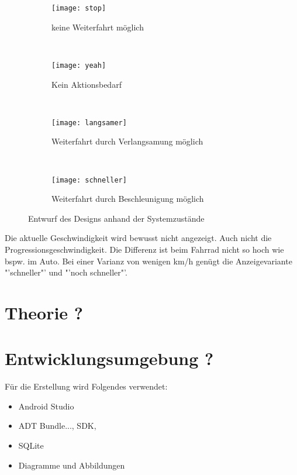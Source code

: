 \begin{figure}[h]
        \centering
           \begin{subfigure}[t]{0.23\textwidth}
                \texttt{[image: stop]}
                \caption[Systemzustand a]{keine Weiterfahrt möglich}
                \label{fig:stop}
        \end{subfigure}
           ~ 
              \begin{subfigure}[t]{0.23\textwidth}
                \texttt{[image: yeah]}
                \caption[Systemzustand b]{Kein Aktionsbedarf}
                \label{fig:yeah}
        \end{subfigure}
           ~
        \begin{subfigure}[t]{0.23\textwidth}
                \texttt{[image: langsamer]}
                \caption[Systemzustand c]{Weiterfahrt durch Verlangsamung  möglich}
                \label{fig:langsamer}
        \end{subfigure}
        ~
        \begin{subfigure}[t]{0.23\textwidth}
                \texttt{[image: schneller]}
                \caption[Systemzustand d]{Weiterfahrt durch Beschleunigung möglich}
                \label{fig:schneller}
        \end{subfigure}     
        \caption[Systemzustände im Ampelbereich]{Entwurf des Designs anhand der Systemzustände}
        \label{fig:mockup}
\end{figure} 
Die aktuelle Geschwindigkeit wird bewusst nicht angezeigt. Auch nicht die Progressionsgeschwindigkeit. Die Differenz ist beim Fahrrad nicht so hoch wie bspw. im Auto. Bei einer Varianz von wenigen km/h genügt die Anzeigevariante "'schneller"' und "'noch schneller"'.
\section{Theorie ?}
\section{Entwicklungsumgebung ?}
Für die Erstellung wird Folgendes verwendet:
\begin{itemize}
	\item Android Studio
	\item ADT Bundle..., SDK, 
	\item SQLite
	\item Diagramme und Abbildungen
\end{itemize}
